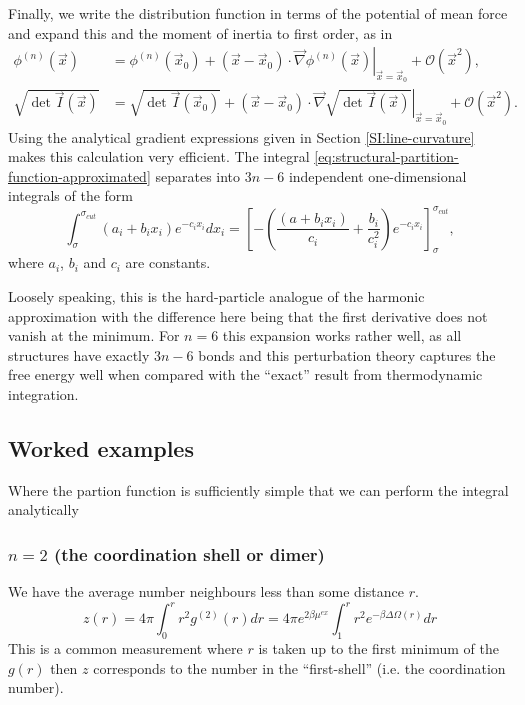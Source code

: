 \documentclass[12pt]{report}
\begin{document}
Finally, we write the distribution function in terms of the potential of mean force and expand this and the moment of inertia to first order, as in
\begin{align}
  \phi^{(n)}(\vec{x}) &=
  \phi^{(n)}(\vec{x}_0) +
  (\vec{x} - \vec{x}_0) \cdot
  \left. \vec{\nabla} \phi^{(n)}(\vec{x}) \right|_{\vec{x} = \vec{x}_0} +
  \mathcal{O}(\vec{x}^2), \\
  \sqrt{\det{\vec{I}(\vec{x})}} &=
  \sqrt{\det{\vec{I}(\vec{x}_0)}} +
  (\vec{x} - \vec{x}_0) \cdot
  \left. \vec{\nabla} \sqrt{\det{\vec{I}(\vec{x})}} \right|_{\vec{x} = \vec{x}_0} +
  \mathcal{O}(\vec{x}^2).
\end{align}
Using the analytical gradient expressions given in Section \ref{SI:line-curvature} makes this calculation very efficient.
The integral \eqref{eq:structural-partition-function-approximated} separates into $3n-6$ independent one-dimensional integrals of the form
\begin{equation*}
  \int_\sigma^{\sigma_{cut}} (a_i + b_i x_i) e^{-c_i x_i} dx_i
  = \left[
    - \left(
    \frac{(a + b_i x_i)}{c_i} + \frac{b_i}{c_i^2} \right) e^{-c_i x_i}
  \right]_\sigma^{\sigma_{cut}},
\end{equation*}
where $a_i$, $b_i$ and $c_i$ are constants.

Loosely speaking, this is the hard-particle analogue of the harmonic approximation with the difference here being that the first derivative does not vanish at the minimum.
For $n=6$ this expansion works rather well, as all structures have exactly $3n-6$ bonds and this perturbation theory captures the free energy well when compared with the ``exact'' result from thermodynamic integration.

\subsection{Worked examples}
Where the partion function is sufficiently simple that we can perform the integral analytically

\subsubsection{$n = 2$ (the coordination shell or dimer)}

We have the average number neighbours less than some distance $r$.
\begin{equation}
  z(r) = 4\pi \int_0^r r^2 g^{(2)}(r) dr
  = 4\pi e^{2\beta \mu^{ex}} \int_1^r r^2 e^{-\beta \Delta \Omega(r)} dr
\end{equation}
This is a common measurement where $r$ is taken up to the first minimum of the $g(r)$ then $z$ corresponds to the number in the ``first-shell'' (i.e. the coordination number).
\end{document}
